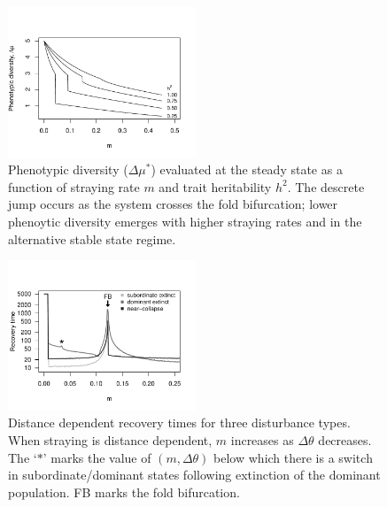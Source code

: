 \documentclass{revtex4}
\begin{document}
\begin{figure}
  \captionsetup{justification=raggedright,
singlelinecheck=false
}
\centering
\includegraphics[width=0.5\textwidth]{figs2/fig_traitdiff.pdf}
\caption{
Phenotypic diversity ($\Delta \mu^*$) evaluated at the steady state as a function of straying rate $m$ and trait heritability $h^2$. The descrete jump occurs as the system crosses the fold bifurcation; lower phenoytic diversity emerges with higher straying rates and in the alternative stable state regime. 
} \label{fig:traitdiff}
\end{figure}

\begin{figure}
  \captionsetup{justification=raggedright,
singlelinecheck=false
}
  \centering
  \includegraphics[width=0.5\textwidth]{figs2/fig_mtheta_rt.pdf}
  \caption{
  Distance dependent recovery times for three disturbance types. When straying is distance dependent, $m$ increases as $\Delta\theta$ decreases.
  The `$*$' marks the value of $(m,\Delta\theta)$ below which there is a switch in subordinate/dominant states following extinction of the dominant population.
  FB marks the fold bifurcation.
  } \label{fig:mtheta}
\end{figure}
\end{document}
